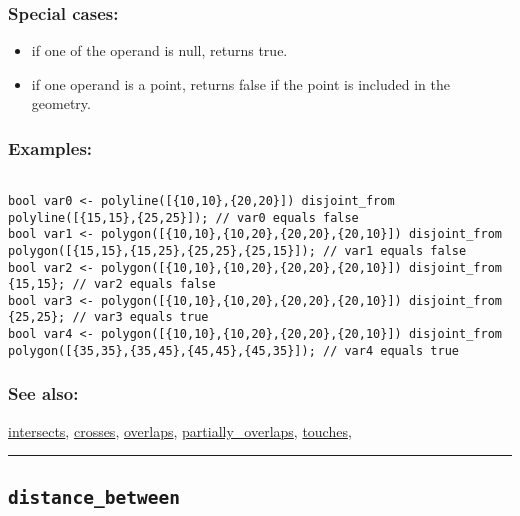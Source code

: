 \documentclass[]{book}
\providecommand{\tightlist}{%
  \setlength{\itemsep}{0pt}\setlength{\parskip}{0pt}}
\theoremstyle{definition}
\theoremstyle{definition}
\theoremstyle{definition}
\theoremstyle{remark}
\begin{document}
\subsubsection{Special cases:}\label{special-cases-50}

\begin{itemize}
\tightlist
\item
  if one of the operand is null, returns true.\\
\item
  if one operand is a point, returns false if the point is included in
  the geometry.
\end{itemize}

\subsubsection{Examples:}\label{examples-101}

\begin{verbatim}
 
bool var0 <- polyline([{10,10},{20,20}]) disjoint_from polyline([{15,15},{25,25}]); // var0 equals false 
bool var1 <- polygon([{10,10},{10,20},{20,20},{20,10}]) disjoint_from polygon([{15,15},{15,25},{25,25},{25,15}]); // var1 equals false 
bool var2 <- polygon([{10,10},{10,20},{20,20},{20,10}]) disjoint_from {15,15}; // var2 equals false 
bool var3 <- polygon([{10,10},{10,20},{20,20},{20,10}]) disjoint_from {25,25}; // var3 equals true 
bool var4 <- polygon([{10,10},{10,20},{20,20},{20,10}]) disjoint_from polygon([{35,35},{35,45},{45,45},{45,35}]); // var4 equals true
\end{verbatim}

\subsubsection{See also:}\label{see-also-79}

\href{OperatorsIM\#intersects}{intersects},
\href{OperatorsBC\#crosses}{crosses},
\href{OperatorsNR\#overlaps}{overlaps},
\href{OperatorsNR\#partially_overlaps}{partially\_overlaps},
\href{OperatorsSZ\#touches}{touches},

\begin{center}\rule{0.5\linewidth}{\linethickness}\end{center}

\subsection{\texorpdfstring{\texttt{distance\_between}}{distance\_between}}\label{distance_between}
\end{document}
